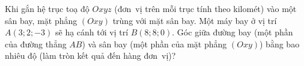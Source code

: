 \begin{bt}%
	Khi gắn hệ trục toạ độ $Oxyz$ (đơn~vị trên mỗi trục tính theo kilomét) vào một sân bay, mặt phẳng $(Oxy)$ trùng với mặt sân bay. Một máy bay ở vị trí $A\left(3;2;-3\right)$ sẽ hạ cánh tới vị trí $B\left(8;8;0\right)$. Góc giữa đường bay (một phần của đường thẳng $AB$) và sân bay (một phần của mặt phẳng $(Oxy)$) bằng bao nhiêu độ (làm tròn kết quả đến hàng  đơn~vị)?
\end{bt}
